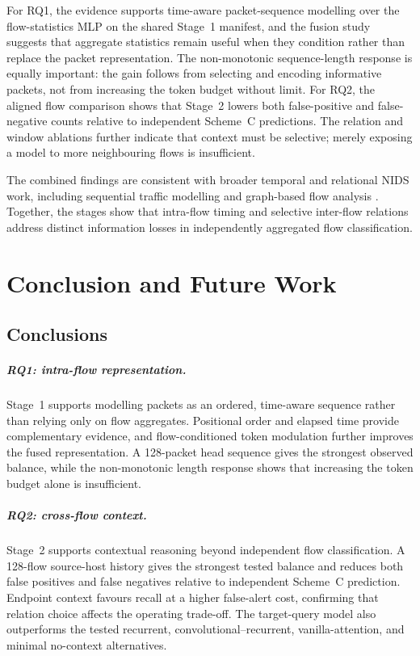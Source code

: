 \documentclass[11pt,fleqn]{report}
\begin{document}
For RQ1, the evidence supports time-aware packet-sequence modelling over the flow-statistics MLP on the shared Stage~1 manifest, and the fusion study suggests that aggregate statistics remain useful when they condition rather than replace the packet representation. The non-monotonic sequence-length response is equally important: the gain follows from selecting and encoding informative packets, not from increasing the token budget without limit. For RQ2, the aligned flow comparison shows that Stage~2 lowers both false-positive and false-negative counts relative to independent Scheme~C predictions. The relation and window ablations further indicate that context must be selective; merely exposing a model to more neighbouring flows is insufficient.

The combined findings are consistent with broader temporal and relational NIDS work, including sequential traffic modelling and graph-based flow analysis \cite{LiuPatras2022NetSentry,Deng2023FlowTopology,Xu2024SSLGNN}. Together, the stages show that intra-flow timing and selective inter-flow relations address distinct information losses in independently aggregated flow classification.


\chapter{Conclusion and Future Work}
\label{sec:conclusion_future_work}

\section{Conclusions}
\label{subsec:conclusion_rq_answers}

\paragraph{RQ1: intra-flow representation.}
Stage~1 supports modelling packets as an ordered, time-aware sequence rather than relying only on flow aggregates. Positional order and elapsed time provide complementary evidence, and flow-conditioned token modulation further improves the fused representation. A 128-packet head sequence gives the strongest observed balance, while the non-monotonic length response shows that increasing the token budget alone is insufficient.

\paragraph{RQ2: cross-flow context.}
Stage~2 supports contextual reasoning beyond independent flow classification. A 128-flow source-host history gives the strongest tested balance and reduces both false positives and false negatives relative to independent Scheme~C prediction. Endpoint context favours recall at a higher false-alert cost, confirming that relation choice affects the operating trade-off. The target-query model also outperforms the tested recurrent, convolutional--recurrent, vanilla-attention, and minimal no-context alternatives.
\end{document}
